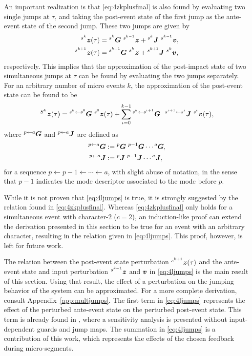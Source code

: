 \documentclass[../DC2019003Bouma.tex]{subfiles}
\begin{document}
An important realization is that \eqref{eq:4zkplusfinal} is also found by evaluating two single jumps at $\tau$, and taking the post-event state of the first jump as the ante-event state of the second jump. These two jumps are given by
\begin{align}
\hspace{0cm}^{s^{k}}{\boldsymbol{z}}(\tau) &= \hspace{0cm}^{s^{k}}{\boldsymbol{G}}\ \hspace{0cm}^{s^{k-1}}{\boldsymbol{z}} + \hspace{0cm}^{s^{k}}{\boldsymbol{J}}\ \hspace{0cm}^{s^{k-1}}{\boldsymbol{v}},\\
\hspace{0cm}^{s^{k+1}}{\boldsymbol{z}}(\tau) &= \hspace{0cm}^{s^{k+1}}{\boldsymbol{G}}\ \hspace{0cm}^{s^{k}}{\boldsymbol{z}} + \hspace{0cm}^{s^{k+1}}{\boldsymbol{J}}\ \hspace{0cm}^{s^{k}}{\boldsymbol{v}},
\end{align}
respectively. This implies that the approximation of the post-impact state of two simultaneous jumps at $\tau$ can be found by evaluating the two jumps separately. For an arbitrary number of micro events $k$, the approximation of the post-event state can be found to be
\begin{align}
\ls^{S^k}\zb(\tau) = \ls^{s^k\leftarrow s^0}\Gb\ \ls^{s^0}\zb(\tau) + \sum_{\iota=0}^{k-1}\ls^{s^{k}\leftarrow s^{\iota+1}}\Gb\ \ ^{s^{\iota+1}\leftarrow s^{\iota}}\Jb\ \ls^{s^{\iota}}\vb(\tau),\label{eq:4ljumps}
\end{align}
where $\hspace{0cm}^{p\leftarrow a}{\boldsymbol{G}}$ and $\hspace{0cm}^{p\leftarrow a}{\boldsymbol{J}}$ are defined as
\begin{align}
\ls^{p\leftarrow a}\Gb &:= \ls^{p}\Gb\ \ls^{p-1}\Gb\cdots\ls^{a}\Gb,\\
\ls^{p\leftarrow a}\Jb &:= \ls^{p}\Jb\ \ls^{p-1}\Jb\cdots\ls^{a}\Jb,
\end{align}
for a sequence $p\leftarrow p-1 \leftarrow \cdots \leftarrow a$, with slight abuse of notation, in the sense that $p-1$ indicates the mode descriptor associated to the mode before $p$. 
\begin{sloppypar}
\begin{myremark}
While it is not proven that \eqref{eq:4ljumps} is true, it is strongly suggested by the relation found in \eqref{eq:4zkplusfinal}. Whereas \eqref{eq:4zkplusfinal} only holds for a simultaneous event with character-2 ($c=2$), an induction-like proof can extend the derivation presented in this section to be true for an event with an arbitrary character, resulting in the relation given in \eqref{eq:4ljumps}. This proof, however, is left for future work.
\end{myremark}
\end{sloppypar}
The relation between the post-event state perturbation $\hspace{0cm}^{s^{k+1}}{\boldsymbol{z}}(\tau)$ and the ante-event state and input perturbation $\hspace{0cm}^{s^{k-1}}{\boldsymbol{z}}$ and ${\boldsymbol{v}}$ in \eqref{eq:4ljumps} is the main result of this section. Using that result, the effect of a perturbation on the jumping behavior of the system can be approximated. For a more complete derivation, consult Appendix~\ref{app:multjumps}. The first term in \eqref{eq:4ljumps} represents the effect of the perturbed ante-event state on the perturbed post-event state. This term is already found in \cite{Rijnen2018}, where a sensitivity analysis is presented without input-dependent guards and jump maps. The summation in \eqref{eq:4ljumps} is a contribution of this work, which represents the effects of the chosen feedback during micro-segments.
\end{document}
